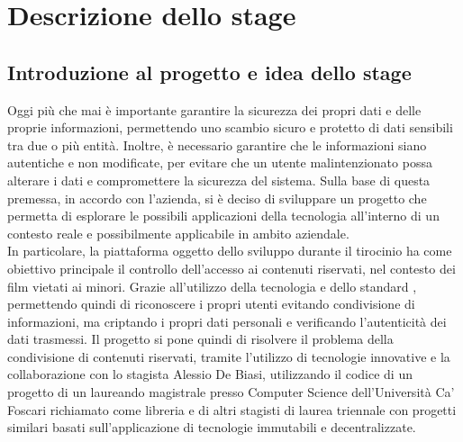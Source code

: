 \chapter{Descrizione dello stage}\label{cap:descrizione-stage}


\section{Introduzione al progetto e idea dello stage}

Oggi più che mai è importante garantire la sicurezza dei propri dati e delle proprie informazioni, permettendo uno scambio sicuro
e protetto di dati sensibili tra due o più entità. Inoltre, è necessario garantire che le informazioni siano autentiche e non modificate,
per evitare che un utente malintenzionato possa alterare i dati e compromettere la sicurezza del sistema.
Sulla base di questa premessa, in accordo con l'azienda, si è deciso di sviluppare un progetto che permetta di esplorare 
le possibili applicazioni della tecnologia  all'interno di un contesto reale e possibilmente applicabile in ambito aziendale. \\

In particolare, la piattaforma oggetto dello sviluppo durante il tirocinio ha come obiettivo principale il controllo dell'accesso ai contenuti
riservati, nel contesto dei film vietati ai minori. Grazie all'utilizzo della tecnologia  e dello standard  ,
permettendo quindi di riconoscere i propri utenti evitando condivisione di informazioni, ma criptando i propri dati personali e verificando l'autenticità
dei dati trasmessi. Il progetto si pone quindi di risolvere il problema della condivisione di contenuti riservati, tramite l'utilizzo di tecnologie innovative
e la collaborazione con lo stagista Alessio De Biasi, utilizzando il codice di un progetto di un laureando magistrale presso Computer Science
dell'Università Ca' Foscari richiamato come libreria e di altri stagisti di laurea triennale con progetti similari basati sull'applicazione di tecnologie immutabili e decentralizzate. \\

